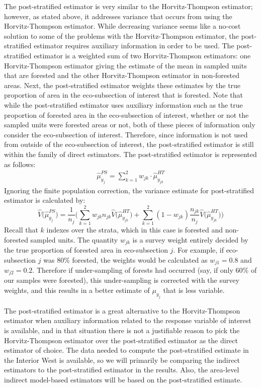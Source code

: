 \documentclass[12pt,twoside]{reedthesis}
\begin{document}
The post-stratified estimator is very similar to the Horvitz-Thompson estimator; however, as stated above, it addresses variance that occurs from using the Horvitz-Thompson estimator. While decreasing variance seems like a no-cost solution to some of the problems with the Horvitz-Thompson estimator, the post-stratified estimator requires auxiliary information in order to be used. The post-stratified estimator is a weighted sum of two Horvitz-Thompson estimators: one Horvitz-Thompson estimator giving the estimate of the mean in sampled units that are forested and the other Horvitz-Thompson estimator in non-forested areas. Next, the post-stratified estimator weights these estimates by the true proportion of area in the eco-subsection of interest that is forested. Note that while the post-stratified estimator uses auxiliary information such as the true proportion of forested area in the eco-subsection of interest, whether or not the sampled units were forested areas or not, both of these pieces of information only consider the eco-subsection of interest. Therefore, since information is not used from outside of the eco-subsection of interest, the post-stratified estimator is still within the family of direct estimators. The post-stratified estimator is represented as follows:
\begin{align}
\hat\mu_{y_j}^{PS} = \sum_{k=1}^{2} w_{jk} \cdot \hat\mu_{y_{jk}}^{HT}
\end{align}
Ignoring the finite population correction, the variance estimate for post-stratified estimator is calculated by:
\[
\hat V\Big(\hat \mu_{y_j}^{PS}\Big) = 
\frac{1}{n_j} \Bigg( \sum_{k=1}^{2} w_{jk} n_{jk} \hat V\Big(\hat\mu_{y_{jk}}^{HT}\Big) + 
\sum_{k=1}^{2} (1 - w_{jk}) \frac{n_{jk}}{n_j} \hat V\Big(\hat\mu_{y_{jk}}^{HT}\Big) \Bigg)
\]
Recall that \(k\) indexes over the strata, which in this case is forested and non-forested sampled units. The quantity \(w_{jk}\) is a survey weight entirely decided by the true proportion of forested area in eco-subsection \(j\). For example, if eco-subsection \(j\) was 80\% forested, the weights would be calculated as \(w_{j1} = 0.8\) and \(w_{j2} = 0.2\). Therefore if under-sampling of forests had occurred (say, if only 60\% of our samples were forested), this under-sampling is corrected with the survey weights, and this results in a better estimate of \(\mu_{y_j}\) that is less variable.

The post-stratified estimator is a great alternative to the Horvitz-Thompson estimator when auxiliary information related to the response variable of interest is available, and in that situation there is not a justifiable reason to pick the Horvitz-Thompson estimator over the post-stratified estimator as the direct estimator of choice. The data needed to compute the post-stratified estimate in the Interior West is available, so we will primarily be comparing the indirect estimators to the post-stratified estimator in the results. Also, the area-level indirect model-based estimators will be based on the post-stratified estimate.
\end{document}
